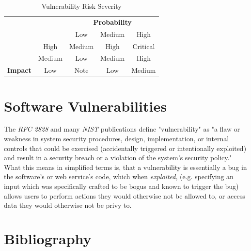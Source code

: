 \documentclass[a4paper,12pt]{article}
\begin{document}
	\begin{table}[!htbp]
		\centering
		\begin{tabular}{ccccc}
			\multicolumn{1}{l}{} & \multicolumn{1}{l}{} & \multicolumn{3}{c}{{\bf Probability}} \\
			\multicolumn{1}{l}{} &  & \cellcolor[HTML]{EFEFEF}Low & \cellcolor[HTML]{C0C0C0}Medium & \cellcolor[HTML]{9B9B9B}High \\
			& \cellcolor[HTML]{9B9B9B}High & \cellcolor[HTML]{F8A102}Medium & \cellcolor[HTML]{FE0000}High & \cellcolor[HTML]{FFCCC9}Critical \\
			& \cellcolor[HTML]{C0C0C0}Medium & \cellcolor[HTML]{FCFF2F}Low & \cellcolor[HTML]{F8A102}Medium & \cellcolor[HTML]{FE0000}High \\
			\multirow{-3}{*}{{\bf Impact}} & \cellcolor[HTML]{EFEFEF}Low & \cellcolor[HTML]{34FF34}Note & \cellcolor[HTML]{FCFF2F}Low & \cellcolor[HTML]{F8A102}Medium
		\end{tabular}
		\caption{Vulnerability Risk Severity}
		\label{vulnrisksever}
	\end{table}

\newpage
\section{Software Vulnerabilities}
	
	The \textit{RFC 2828} and many \textit{NIST} publications define "vulnerability" as "a flaw or weakness in system security procedures, design, implementation, or internal controls that could be exercised (accidentally triggered or intentionally exploited) and result in a security breach or a violation of the system's security policy."\cite{rfc2828,nist80030} What this means in simplified terms is, that a vulnerability is essentially a bug in the software's or web service's code, which when \textit{exploited}, (e.g. specifying an input which was specifically crafted to be bogus and known to trigger the bug) allows users to perform actions they would otherwise not be allowed to, or access data they would otherwise not be privy to.
	
\newpage
\section{Bibliography}
\end{document}
